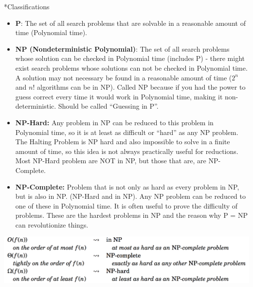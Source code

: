 \documentclass[3pt,landscape]{article}
\makeatletter
\renewcommand{\subsection}{\@startsection{subsection}{2}{0mm}{-1explus -.5ex minus -.2ex}{0.5ex plus .2ex}{\normalfont\normalsize\bfseries}}
\makeatother
\begin{document}
\begin{multicols}{3}
\subsection*{Classifications}
\begin{itemize}
\item \textbf{P}: The set of all search problems that are solvable in a reasonable amount of time (Polynomial time).
\item \textbf{NP (Nondeterministic Polynomial)}: The set of all search problems whose solution can be checked in Polynomial time (includes P) - there might exist search problems whose solutions can not be checked in Polynomial time. A solution may not necessary be found in a reasonable amount of time ($2^n$ and $n!$ algorithms can be in NP). Called NP because if you had the power to guess correct every time it would work in Polynomial time, making it non-deterministic. Should be called ``Guessing in P''.
\item \textbf{NP-Hard:} Any problem in NP can be reduced to this problem in Polynomial time, so it is at least as difficult or ``hard'' as any NP problem. The Halting Problem is NP hard and also impossible to solve in a finite amount of time, so this idea is not always practically useful for reductions. Most NP-Hard problem are NOT in NP, but those that are, are NP-Complete.
\item \textbf{NP-Complete: }Problem that is not only as hard as every problem in NP, but is also in NP. (NP-Hard and in NP). Any NP problem can be reduced to one of these in Polynomial time. It is often useful to prove the difficulty of problems. These are the hardest problems in NP and the reason why P = NP can revolutionize things. 
\end{itemize}
\begin{center}
\includegraphics[scale=.25]{images/analogy.png}
\end{center}


\end{multicols}
\end{document}
